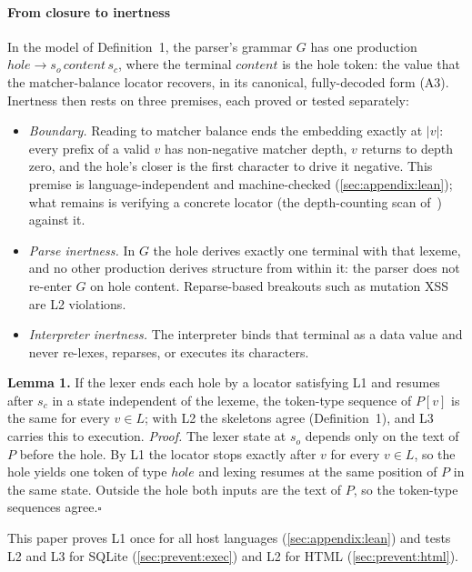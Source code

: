 \paragraph{From closure to inertness}
In the model of Definition~1, the parser's grammar $G$ has one production
$\mathit{hole}\rightarrow s_o\,\mathit{content}\,s_c$, where the terminal
$\mathit{content}$ is the hole token: the value that the matcher-balance locator
recovers, in its canonical, fully-decoded form (A3).
Inertness then rests on three premises, each proved or tested separately:
\begin{itemize}
\item[\textbf{L1}] \emph{Boundary.} Reading to matcher balance ends the
	embedding exactly at $|v|$: every prefix of a valid $v$ has non-negative
	matcher depth, $v$ returns to depth zero, and the hole's closer is the first
	character to drive it negative. This premise is language-independent and
	machine-checked (\cref{sec:appendix:lean}); what remains is verifying a concrete locator
	(the depth-counting scan of~\cite{matchertext}) against it.
\item[\textbf{L2}] \emph{Parse inertness.} In $G$ the hole derives exactly one
	terminal with that lexeme, and no other production derives structure from
	within it: the parser does not re-enter $G$ on hole content. Reparse-based
	breakouts such as mutation XSS are L2 violations.
\item[\textbf{L3}] \emph{Interpreter inertness.} The interpreter binds that
	terminal as a data value and never re-lexes, reparses, or executes its
	characters.
\end{itemize}
\textbf{Lemma 1.} If the lexer ends each hole by a locator satisfying L1 and
resumes after $s_c$ in a state independent of the lexeme, the token-type sequence
of $P[v]$ is the same for every $v\in L$; with L2 the
skeletons agree (Definition~1), and L3 carries this to execution.
\emph{Proof.} The lexer state at $s_o$ depends only on the text of $P$ before the hole. By L1
the locator stops exactly after $v$ for every $v\in L$, so the hole yields one
token of type $\mathit{hole}$ and lexing resumes at the same position of $P$ in
the same state. Outside the hole both inputs are the text of $P$, so the
token-type sequences agree.\hfill$\square$

This paper proves L1 once for all host languages
(\cref{sec:appendix:lean}) and tests L2 and L3 for SQLite (\cref{sec:prevent:exec}) and
L2 for HTML (\cref{sec:prevent:html}).

